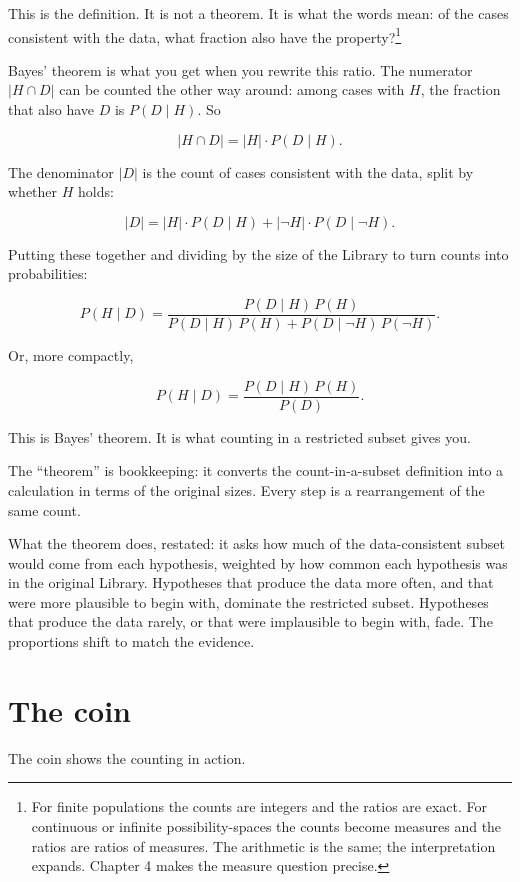 This is the definition. It is not a theorem. It is what the words mean: of the cases consistent with the data, what fraction also have the property?\footnote{For finite populations the counts are integers and the ratios are exact. For continuous or infinite possibility-spaces the counts become measures and the ratios are ratios of measures. The arithmetic is the same; the interpretation expands. Chapter 4 makes the measure question precise.}

Bayes' theorem is what you get when you rewrite this ratio. The numerator $|H \cap D|$ can be counted the other way around: among cases with $H$, the fraction that also have $D$ is $P(D \mid H)$. So

$$|H \cap D| = |H| \cdot P(D \mid H).$$

The denominator $|D|$ is the count of cases consistent with the data, split by whether $H$ holds:

$$|D| = |H| \cdot P(D \mid H) + |\neg H| \cdot P(D \mid \neg H).$$

Putting these together and dividing by the size of the Library to turn counts into probabilities:

$$P(H \mid D) = \frac{P(D \mid H) \, P(H)}{P(D \mid H) \, P(H) + P(D \mid \neg H) \, P(\neg H)}.$$

Or, more compactly,

$$P(H \mid D) = \frac{P(D \mid H) \, P(H)}{P(D)}.$$

This is Bayes' theorem. It is what counting in a restricted subset gives you.

The ``theorem'' is bookkeeping: it converts the count-in-a-subset definition into a calculation in terms of the original sizes. Every step is a rearrangement of the same count.

What the theorem does, restated: it asks how much of the data-consistent subset would come from each hypothesis, weighted by how common each hypothesis was in the original Library. Hypotheses that produce the data more often, and that were more plausible to begin with, dominate the restricted subset. Hypotheses that produce the data rarely, or that were implausible to begin with, fade. The proportions shift to match the evidence.

\section*{The coin}

The coin shows the counting in action.

